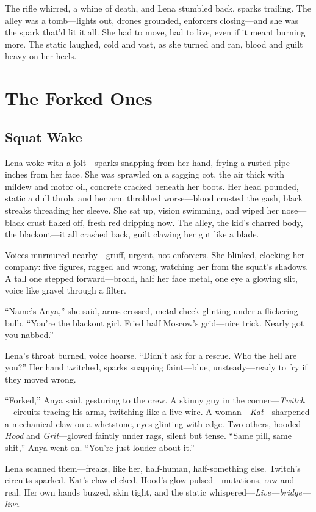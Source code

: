 \documentclass[12pt]{book}
\begin{document}
The rifle whirred, a whine of death, and Lena stumbled back, sparks trailing. The alley was a tomb---lights out, drones grounded, enforcers closing---and she was the spark that’d lit it all. She had to move, had to live, even if it meant burning more. The static laughed, cold and vast, as she turned and ran, blood and guilt heavy on her heels.

\chapter{The Forked Ones}
\section{Squat Wake}

Lena woke with a jolt---sparks snapping from her hand, frying a rusted pipe inches from her face. She was sprawled on a sagging cot, the air thick with mildew and motor oil, concrete cracked beneath her boots. Her head pounded, static a dull throb, and her arm throbbed worse---blood crusted the gash, black streaks threading her sleeve. She sat up, vision swimming, and wiped her nose---black crust flaked off, fresh red dripping now. The alley, the kid’s charred body, the blackout---it all crashed back, guilt clawing her gut like a blade.

Voices murmured nearby---gruff, urgent, not enforcers. She blinked, clocking her company: five figures, ragged and wrong, watching her from the squat’s shadows. A tall one stepped forward---broad, half her face metal, one eye a glowing slit, voice like gravel through a filter.

``Name’s Anya,'' she said, arms crossed, metal cheek glinting under a flickering bulb. ``You’re the blackout girl. Fried half Moscow’s grid---nice trick. Nearly got you nabbed.''

Lena’s throat burned, voice hoarse. ``Didn’t ask for a rescue. Who the hell are you?'' Her hand twitched, sparks snapping faint---blue, unsteady---ready to fry if they moved wrong.

``Forked,'' Anya said, gesturing to the crew. A skinny guy in the corner---\emph{Twitch}---circuits tracing his arms, twitching like a live wire. A woman---\emph{Kat}---sharpened a mechanical claw on a whetstone, eyes glinting with edge. Two others, hooded---\emph{Hood} and \emph{Grit}---glowed faintly under rags, silent but tense. ``Same pill, same shit,'' Anya went on. ``You’re just louder about it.''

Lena scanned them---freaks, like her, half-human, half-something else. Twitch’s circuits sparked, Kat’s claw clicked, Hood’s glow pulsed---mutations, raw and real. Her own hands buzzed, skin tight, and the static whispered---\emph{Live---bridge---live}.
\end{document}
